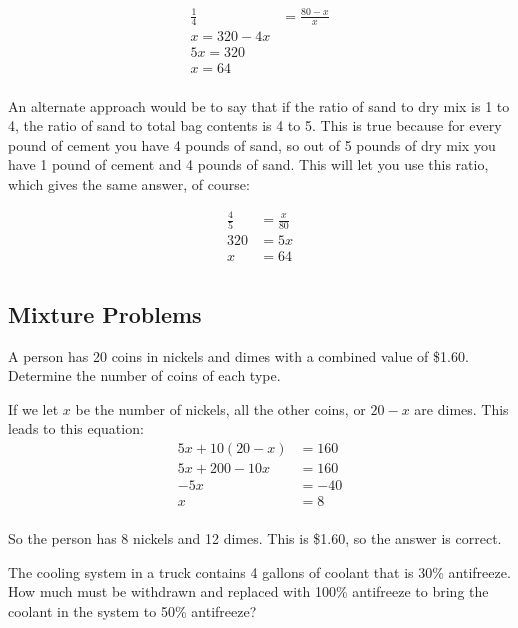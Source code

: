 \documentclass[fleqn,addpoints]{exam}
\begin{document}
\begin{questions}
\begin{solution}
\begin{align*}
  \frac{1}{4} &= \frac{80-x}{x} \\
  x = 320 - 4x \\
  5x = 320 \\
  x = 64 \\
\end{align*}

An alternate approach would be to say that if the ratio of sand to dry mix is 1 to 4, the ratio of sand to total bag
contents is 4 to 5.  This is true because for every pound of cement you have 4 pounds of sand, so out of 5 pounds of dry
mix you have 1 pound of cement and 4 pounds of sand.  This will let you use this ratio, which gives the same answer, of
course: 

\begin{align*}
  \frac{4}{5} &= \frac{x}{80} \\
  320 &= 5x \\
  x &= 64 \\ 
\end{align*}

\end{solution}

\subsection{Mixture Problems}
\question
A person has 20 coins in nickels and dimes with a combined value of \$1.60.  Determine the number of coins of each type.

\begin{solution}
  If we let $x$ be the number of nickels, all the other coins, or $20-x$ are dimes.  This leads to this equation:
\begin{align*}
  5x + 10(20-x) &= 160 \\
  5x + 200 - 10x &= 160 \\
  -5x &= -40 \\
  x &= 8 \\
\end{align*}

So the person has 8 nickels and 12 dimes.  This is \$1.60, so the answer is correct.

\end{solution}

\question
The cooling system in a truck contains 4 gallons of coolant that is 30\% antifreeze.  How much must be withdrawn and
replaced with 100\% antifreeze to bring the coolant in the system to 50\% antifreeze?


\end{questions}
\end{document}

